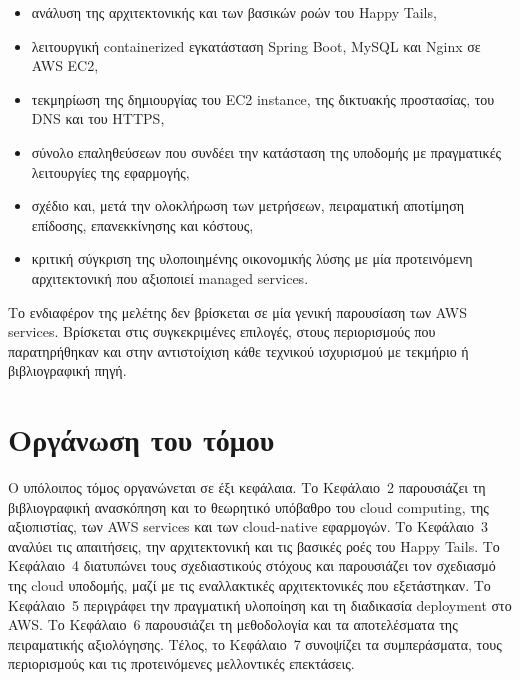 \begin{itemize}
  \item ανάλυση της αρχιτεκτονικής και των βασικών ροών του Happy Tails,
  \item λειτουργική containerized εγκατάσταση Spring Boot, MySQL και Nginx
        σε AWS EC2,
  \item τεκμηρίωση της δημιουργίας του EC2 instance, της δικτυακής προστασίας,
        του DNS και του HTTPS,
  \item σύνολο επαληθεύσεων που συνδέει την κατάσταση της υποδομής με
        πραγματικές λειτουργίες της εφαρμογής,
  \item σχέδιο και, μετά την ολοκλήρωση των μετρήσεων, πειραματική αποτίμηση
        επίδοσης, επανεκκίνησης και κόστους,
  \item κριτική σύγκριση της υλοποιημένης οικονομικής λύσης με μία
        προτεινόμενη αρχιτεκτονική που αξιοποιεί managed services.
\end{itemize}

Το ενδιαφέρον της μελέτης δεν βρίσκεται σε μία γενική παρουσίαση των AWS
services. Βρίσκεται στις συγκεκριμένες επιλογές, στους περιορισμούς που
παρατηρήθηκαν και στην αντιστοίχιση κάθε τεχνικού ισχυρισμού με τεκμήριο ή
βιβλιογραφική πηγή.

\section{Οργάνωση του τόμου}
Ο υπόλοιπος τόμος οργανώνεται σε έξι κεφάλαια. Το Κεφάλαιο~2 παρουσιάζει τη
βιβλιογραφική ανασκόπηση και το θεωρητικό υπόβαθρο του cloud computing, της
αξιοπιστίας, των AWS services και των cloud-native εφαρμογών. Το
Κεφάλαιο~3 αναλύει τις απαιτήσεις, την αρχιτεκτονική και τις βασικές ροές
του Happy Tails. Το Κεφάλαιο~4 διατυπώνει τους σχεδιαστικούς στόχους και
παρουσιάζει τον σχεδιασμό της cloud υποδομής, μαζί με τις εναλλακτικές
αρχιτεκτονικές που εξετάστηκαν. Το Κεφάλαιο~5 περιγράφει την πραγματική
υλοποίηση και τη διαδικασία deployment στο AWS. Το Κεφάλαιο~6 παρουσιάζει
τη μεθοδολογία και τα αποτελέσματα της πειραματικής αξιολόγησης. Τέλος, το
Κεφάλαιο~7 συνοψίζει τα συμπεράσματα, τους περιορισμούς και τις προτεινόμενες
μελλοντικές επεκτάσεις.
